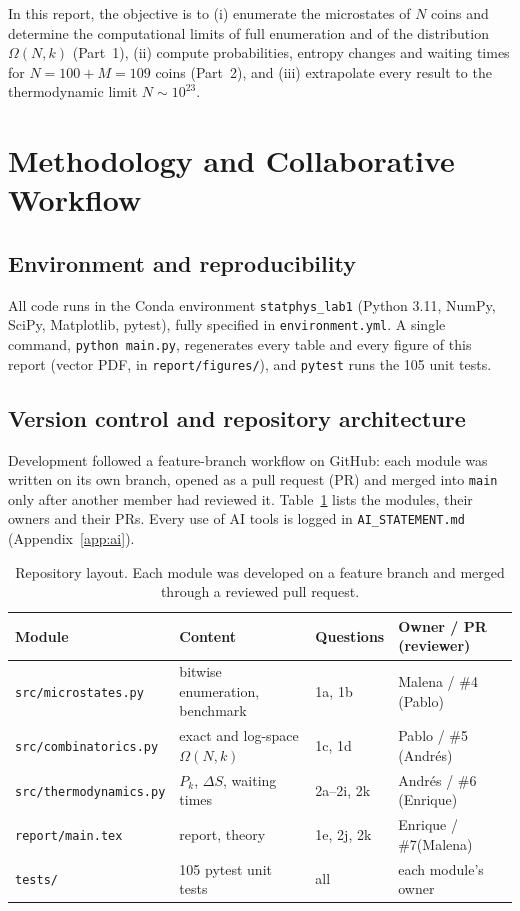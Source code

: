 \documentclass[11pt,a4paper]{article}
\begin{document}
In this report, the objective is to (i) enumerate the microstates of $N$ coins and determine
the computational limits of full enumeration and of the distribution $\Omega(N,k)$ (Part~1),
(ii) compute probabilities, entropy changes and waiting times for $N=100+M=109$ coins
(Part~2), and (iii) extrapolate every result to the thermodynamic limit $N\sim10^{23}$.

\section{Methodology and Collaborative Workflow}
\label{sec:methods}
\subsection{Environment and reproducibility}
All code runs in the Conda environment \texttt{statphys\_lab1} (Python 3.11, NumPy, SciPy,
Matplotlib, pytest), fully specified in \texttt{environment.yml}. A single command,
\texttt{python main.py}, regenerates every table and every figure of this report (vector PDF,
in \texttt{report/figures/}), and \texttt{pytest} runs the 105 unit tests.

\subsection{Version control and repository architecture}
Development followed a feature-branch workflow on GitHub: each module was written on its own
branch, opened as a pull request (PR) and merged into \texttt{main} only after another member
had reviewed it. Table~\ref{tab:repo} lists the modules, their owners and their PRs. Every use
of AI tools is logged in \texttt{AI\_STATEMENT.md} (Appendix~\ref{app:ai}).

\begin{table}[H]
  \centering
  \small
  \begin{tabular}{llll}
    \toprule
    Module & Content & Questions & Owner / PR (reviewer) \\
    \midrule
    \texttt{src/microstates.py} & bitwise enumeration, benchmark & 1a, 1b & Malena / \#4 (Pablo)\\
    \texttt{src/combinatorics.py} & exact and log-space $\Omega(N,k)$ & 1c, 1d & Pablo / \#5 (Andrés)\\
    \texttt{src/thermodynamics.py} & $P_k$, $\Delta S$, waiting times & 2a--2i, 2k & Andrés / \#6 (Enrique)\\
    \texttt{report/main.tex} & report, theory & 1e, 2j, 2k & Enrique / \#7(Malena)\\
    \texttt{tests/} & 105 pytest unit tests & all & each module's owner \\
    \bottomrule
  \end{tabular}
  \caption{Repository layout. Each module was developed on a feature branch and merged through a
  reviewed pull request.}
  \label{tab:repo}
\end{table}
\end{document}
